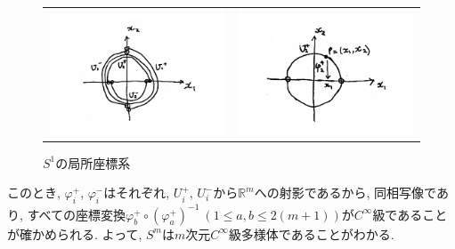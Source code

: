 \documentclass[dvipdfmx,cjk]{beamer}
\theoremstyle{definition}
\begin{document}
  \begin{frame}
    \begin{figure}[H]
      \begin{tabular}{cc}
        \begin{minipage}[t]{0.45\hsize}
          \centering
          \includegraphics[keepaspectratio, scale=0.25]{localCoSysOfS1_1.pdf}
          \caption{$S^1$の開集合}
          \label{}
        \end{minipage} &
        \begin{minipage}[t]{0.45\hsize}
          \centering
          \includegraphics[keepaspectratio, scale=0.25]{localCoSysOfS1_2.pdf}
          \caption{$S^1$の局所座標系}
          \label{}
        \end{minipage}
      \end{tabular}
    \end{figure}

        このとき, 
        $\varphi_i^+$, $\varphi_i^-$はそれぞれ, $U_i^+$, 
        $U_i^-$から$\mathbb{R}^m$への射影であるから, 同相写像であり, 
        すべての座標変換$\varphi_b^+\circ(\varphi_a^+)^{-1}\ 
        (1\leq a, b\leq 2(m+1))$が$C^{\infty}$級であることが確かめられる. 
        よって, $S^m$は$m$次元$C^{\infty}$級多様体であることがわかる. 
\end{frame}
\end{document}
